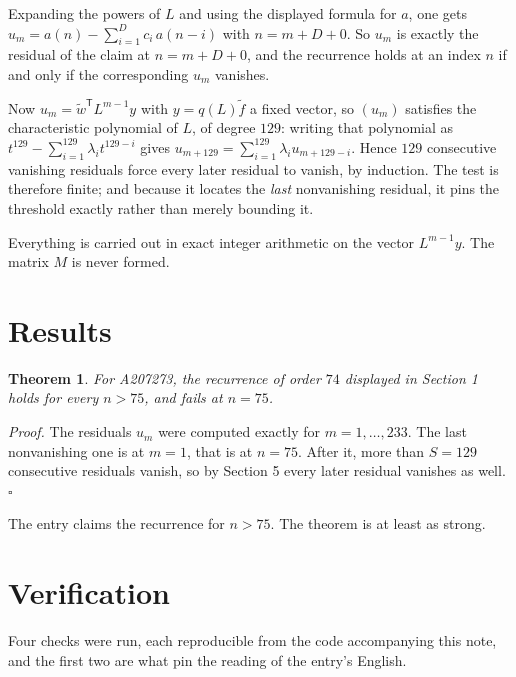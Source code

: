 \documentclass[11pt]{article}
\newtheorem{theorem}{Theorem}
\theoremstyle{definition}
\begin{document}
Expanding the powers of $L$ and using the displayed formula for $a$, one gets $u_m = a(n) - \sum_{i=1}^{D} c_i\,a(n-i)$ with $n = m + D + 0$. So $u_m$ is exactly the residual of the claim at $n = m + D + 0$, and the recurrence holds at an index $n$ if and only if the corresponding $u_m$ vanishes.

Now $u_m = \tilde w^{\mathsf T} L^{m-1} y$ with $y = q(L)\tilde f$ a fixed vector, so $(u_m)$ satisfies the characteristic polynomial of $L$, of degree $129$: writing that polynomial as $t^{129} - \sum_{i=1}^{129} \lambda_i t^{129-i}$ gives $u_{m+129} = \sum_{i=1}^{129} \lambda_i u_{m+129-i}$. Hence $129$ consecutive vanishing residuals force every later residual to vanish, by induction. The test is therefore finite; and because it locates the {\itshape last} nonvanishing residual, it pins the threshold exactly rather than merely bounding it.

Everything is carried out in exact integer arithmetic on the vector $L^{m-1}y$. The matrix $M$ is never formed.

\section{Results}

\begin{theorem} For A207273, the recurrence of order $74$ displayed in Section 1 holds for every $n > 75$, and fails at $n = 75$.\end{theorem}

{\itshape Proof.} The residuals $u_m$ were computed exactly for $m = 1,\dots,233$. The last nonvanishing one is at $m = 1$, that is at $n = 75$. After it, more than $S = 129$ consecutive residuals vanish, so by Section 5 every later residual vanishes as well. $\square$

The entry claims the recurrence for $n > 75$. The theorem is at least as strong.

\section{Verification}

Four checks were run, each reproducible from the code accompanying this note, and the first two are what pin the reading of the entry's English.
\end{document}
